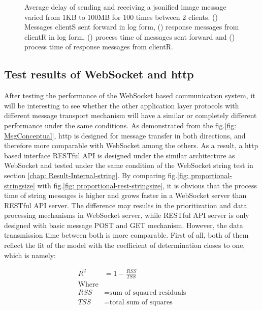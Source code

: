 \begin{figure}[htb]
    \caption{Average delay of sending and receiving a jsonified image message varied from 1KB 
    to 100MB for 100 times between 2 clients. () 
    Messages clientS sent forward in log form, 
    () response messages from clientR in log form, 
    () process time of messages sent forward  
    and () process time of response messages from clientR. 
    \label{fig: proportional-imagesize}}
\end{figure}


\subsection{Test results of WebSocket and \gls{http}} \label{chap: Result-RestFUL_WS}
After testing the performance of the WebSocket based communication system, 
it will be interesting to see whether the other application layer protocols with 
different message transport mechanism will have a similar or completely different 
performance under the same conditions. As demonstrated from the 
fig.\ref{fig: MsgConceptual}, \gls{http} is designed for message 
transfer in both directions, and therefore more comparable with WebSocket among the others. 
As a result, a \gls{http} based interface RESTful API is designed under the similar architecture 
as WebSocket and tested under the same condition of the WebSocket string test in 
section \ref{chap: Result-Internal-string}. By comparing 
fig.\ref{fig: proportional-stringsize} with fig.\ref{fig: proportional-rest-stringsize}, 
it is obvious that the process time of string messages is higher and 
grows faster in a WebSocket server than RESTful API server. The difference may 
results in the prioritization and data processing mechanisms in WebSocket server, 
while RESTful API server is only designed with basic message POST and GET 
mechanism. However, the data transmission time between both is more comparable. 
First of all, both of them reflect the fit of the model with the coefficient 
of determination closes to one, which is namely: 


    \begin{align}
        R^{2} &= 1-\frac{RSS}{TSS}\\
        \text{Where} \nonumber\\
        RSS & = \text{sum of squared residuals} \nonumber\\
        TSS & = \text{total sum of squares}\nonumber
    \end{align}

